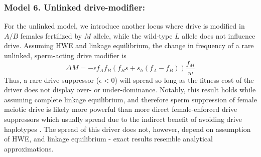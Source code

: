 \documentclass[12pt,letterpaper]{article}
\newcommand{\gc}[1]{{ \color{red} #1}}
\begin{document}
\subsubsection*{Model 6. Unlinked drive-modifier:}
For the unlinked model, we introduce another locus where drive is modified in $A/B$ females fertilized by $M$ allele, 
	while the wild-type $L$ allele does not influence drive. 
Assuming HWE and linkage equilibrium, the change in frequency of a rare unlinked, sperm-acting drive modifier is 
\begin{equation} \Delta M =-\epsilon f_A f_B (f_B s + s_h (f_A - f_B) ) \frac{f_M}{\bar{w}}  \label{unlinked} \end{equation}
Thus, a rare drive suppressor ($\epsilon<0$) will spread so long as the fitness cost of the driver does not display over- or under-dominance. 
Notably, this result holds while assuming complete linkage equilibrium, and therefore sperm suppression of female meiotic drive is likely more powerful than more direct female-enforced drive suppressors  which usually spread due to the indirect benefit of avoiding drive haplotypes \citep[e.g. ][]{Brandvain2012}.  
The spread of this driver does not, however, depend on assumption of HWE, and linkage equilibrium - exact results resemble analytical approximations. 
\end{document}
